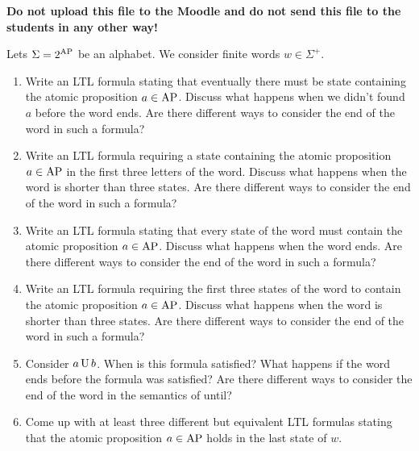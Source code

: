 \documentclass[language=en,sheet=7,prefix]{exercise}
\begin{document}
\begin{solution}
  \textbf{Do not upload this file to the Moodle and do not send this file to the students in any other way!}
\end{solution}


Lets $\Sigma = 2^{\operatorname{AP}}$ be an alphabet. We consider finite words $w \in \Sigma^+$.

\begin{enumerate}
  \item Write an LTL formula stating that eventually there must be state containing the atomic proposition $a \in \operatorname{AP}$. Discuss what happens when we didn't found $a$ before the word ends. Are there different ways to consider the end of the word in such a formula?
  \item Write an LTL formula requiring a state containing the atomic proposition $a \in \operatorname{AP}$ in the first three letters of the word. Discuss what happens when the word is shorter than three states. Are there different ways to consider the end of the word in such a formula?
  \item Write an LTL formula stating that every state of the word must contain the atomic proposition $a \in \operatorname{AP}$. Discuss what happens when the word ends. Are there different ways to consider the end of the word in such a formula?
  \item Write an LTL formula requiring the first three states of the word to contain the atomic proposition $a \in \operatorname{AP}$. Discuss what happens when the word is shorter than three states. Are there different ways to consider the end of the word in such a formula?
  \item Consider $a \operatorname{\relax{U}} b$. When is this formula satisfied? What happens if the word ends before the formula was satisfied? Are there different ways to consider the end of the word in the semantics of until?
  \item Come up with at least three different but equivalent LTL formulas stating that the atomic proposition $a \in \operatorname{AP}$ holds in the last state of $w$.
\end{enumerate}
\end{document}
